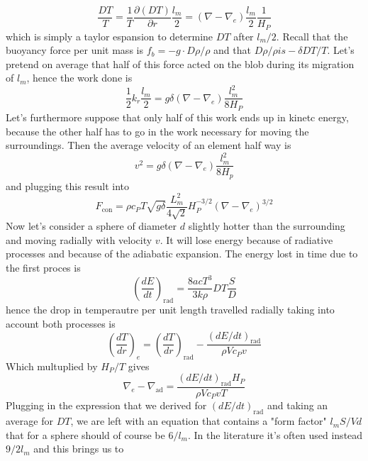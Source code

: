 \documentclass[11pt]{article}
\numberwithin{equation}{section}
\begin{document}
\begin{equation}
	\frac{DT}{T}=\frac{1}{T}\frac{\partial (DT)}{\partial r} \frac{l_m}{2}=(\nabla-\nabla_e)\frac{l_m}{2}\frac{1}{H_P}
\end{equation}
which is simply a taylor espansion to determine $DT$ after $l_m/2$. Recall that the buoyancy force per unit mass is $f_b=-g \cdot D \rho / \rho$ and that $D \rho / \rho is - \delta D T / T$. Let's pretend on average that half of this force acted on the blob during its migration of $l_m$, hence the work done is
\begin{equation}\label{7.6}
	\frac{1}{2} k_r \frac{l_m}{2}=g \delta (\nabla - \nabla_e)\frac{l_m^2}{8 H_P}
\end{equation}
Let's furthermore suppose that only half of this work ends up in kinetc energy, because the other half has to go in the work necessary for moving the surroundings. Then the average velocity of an element half way is
\begin{equation}
	v^2=g \delta (\nabla - \nabla_e)\frac{l_m^2}{8 H_p}
\end{equation}
and plugging this result into \label{fconv}
\begin{equation}
F_{\mathrm{con}}= \rho c_P T \sqrt{g \delta} \frac{L^2_m}{4\sqrt{2}}H_P^{-3/2} (\nabla-\nabla_e)^{3/2}
\end{equation}
Now let's consider a sphere of diameter $d$ slightly hotter than the surrounding and moving radially with velocity $v$. It will lose energy because of radiative processes and because of the adiabatic expansion. The energy lost in time due to the first proces is
\begin{equation}
\left (\frac{d E}{d t}  \right )_{\mathrm{rad}} = \frac{8 a c T^3}{3 k \rho} DT \frac{S}{D}
\end{equation}
hence the drop in temperautre per unit length travelled radially taking into account both processes is
\begin{equation}\label{7.7}
	\left (  \frac{d T}{d r }   \right )_e = \left(  \frac{dT}{d r }   \right )_{\mathrm{rad}} - \frac{\left( d E / dt \right)_{\mathrm{rad}} }{\rho V c_P v}
\end{equation}
Which multuplied by $H_P/T$ gives
\begin{equation}
\nabla_e - \nabla_{\mathrm{ad}} =  \frac{\left( dE/dt \right)_{ \mathrm{rad} } H_P}{\rho V c_P v T}
\end{equation}
Plugging in the expression that we derived for $(dE/dt)_{\mathrm{rad}}$ and taking an average for $DT$, we are left with an equation that contains a "form factor" $l_m S/Vd$ that for a sphere should of course be $6/l_m$. In the literature it's often used instead $9/2l_m$ and this brings us to
\end{document}
